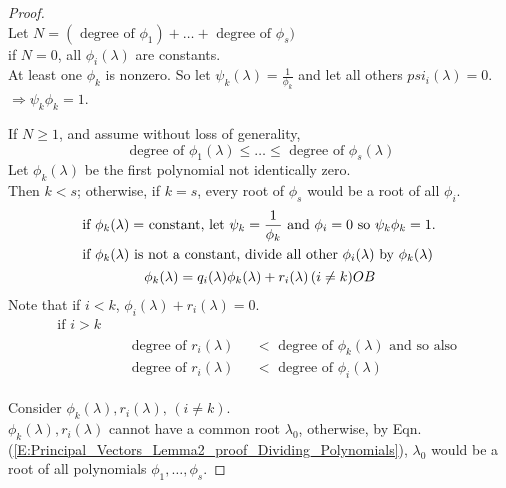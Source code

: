 \documentclass[twoside]{amsart}
\theoremstyle{plain}
\theoremstyle{definition}
\begin{document}
\begin{proof} \quad \\
  Let $N = (\text{  degree of } \phi_1) + \dots + \text{  degree of } \phi_s)$ \\
  \phantom{Le} if $N=0$, all $\phi_i(\lambda)$ are constants.  \\
  \phantom{Let N } At least one $\phi_k$ is nonzero.  So let $\psi_k(\lambda) = \frac{1}{\phi_k}$ and let all others $psi_i(\lambda) = 0$. \\
  \phantom{Let N At least} $\Longrightarrow \psi_k \phi_k = 1$.  

If $N \geq 1$, and assume without loss of generality,
\[
\text{ degree of } \phi_1(\lambda) \leq \dots \leq \text{ degree of } \phi_s(\lambda)
\]  
Let $\phi_k(\lambda)$ be the first polynomial not identically zero.  \\
\phantom{Le} Then $k<s$; otherwise, if $k=s$, every root of $\phi_s$ would be a root of all $\phi_i$.  
\begin{gather}
  \begin{aligned}
    & \text{ if $\phi_k(\lambda) = $ constant, let $\psi_k = \frac{1}{\phi_k}$ and $\phi_i = 0 $ so $\psi_k \phi_k =1$.  }\\
    & \text{ if $\phi_k(\lambda)$ is not a constant, divide all other $\phi_i(\lambda)$ by $\phi_k(\lambda)$ } 
    \end{aligned}
   \notag \\
  \phi_k(\lambda) = q_i (\lambda) \phi_k(\lambda) + r_i(\lambda) \, (i \neq k)  \label{E:Principal_Vectors_Lemma2_proof_Dividing_Polynomials} OB
\end{gather}
Note that if $i<k$, $\phi_i(\lambda) + r_i(\lambda) = 0$.  
\begin{align*}
  \text{ if $i > k$ } & \\
&  \begin{aligned}
    \text{ degree of $r_i(\lambda)$ }  & < \text{ degree of $\phi_k(\lambda)$ and so also } \\
    \text{ degree of $r_i(\lambda)$ }  & < \text{ degree of $\phi_i(\lambda)$ } 
    \end{aligned} 
\end{align*}

Consider $\phi_k(\lambda), r_i(\lambda), \, (i\neq k)$. \\ 
 \phantom{ Consi} $\phi_k(\lambda), r_i(\lambda)$ cannot have a common root $\lambda_0$, otherwise, by Eqn. (\ref{E:Principal_Vectors_Lemma2_proof_Dividing_Polynomials}), $\lambda_0$ would be a root of all polynomials $\phi_1, \dots , \phi_s$.  


\end{proof}
\end{document}
